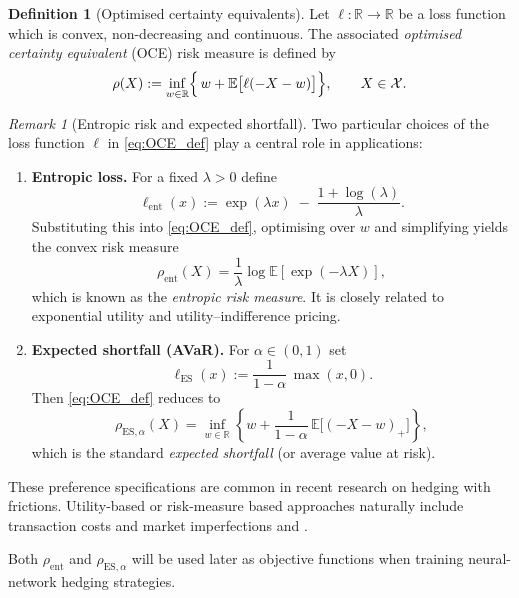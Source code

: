 \documentclass[12pt,a4paper]{article}
\theoremstyle{definition}
\newtheorem{definition}{Definition}[section]
\theoremstyle{plain}
\theoremstyle{remark}
\newtheorem{remark}{Remark}[section]
\theoremstyle{plain}
\begin{document}
\begin{definition}[Optimised certainty equivalents]
\label{def:OCE}
Let $\ell:\mathbb R\to\mathbb R$ be a loss function which is convex, non-decreasing and continuous. 
The associated \emph{optimised certainty equivalent} (OCE) risk measure is defined by
\begin{equation}
\label{eq:OCE_def}
    \rho(X)
    :=
    \inf_{w\in\mathbb R}
    \Bigl\{\,w + \mathbb E\bigl[\ell(-X - w)\bigr]\Bigr\},
    \qquad X\in\mathcal X.
\end{equation}
\end{definition}

\begin{remark}[Entropic risk and expected shortfall]
\label{rem:entropic_es}
Two particular choices of the loss function $\ell$ in \eqref{eq:OCE_def} play a central role in applications:

\begin{enumerate}
    \item \textbf{Entropic loss.}  
    For a fixed $\lambda>0$ define
    \[
        \ell_{\mathrm{ent}}(x)
        :=
        \exp(\lambda x)\;-\;\frac{1+\log(\lambda)}{\lambda}.
    \]
    Substituting this into \eqref{eq:OCE_def}, optimising over $w$ and simplifying yields the convex risk measure
    \[
        \rho_{\mathrm{ent}}(X)
        =
        \frac{1}{\lambda}\log \mathbb E\!\left[\exp(-\lambda X)\right],
    \]
    which is known as the \emph{entropic risk measure}.  
    It is closely related to exponential utility and utility–indifference pricing.

    \item \textbf{Expected shortfall (AVaR).}  
    For $\alpha\in(0,1)$ set
    \[
        \ell_{\mathrm{ES}}(x)
        :=
        \frac{1}{1-\alpha}\,\max(x,0).
    \]
    Then \eqref{eq:OCE_def} reduces to
    \[
        \rho_{\mathrm{ES},\alpha}(X)
        =
        \inf_{w\in\mathbb R}
        \left\{
            w + \frac{1}{1-\alpha}\,
            \mathbb E\bigl[(-X-w)_{+}\bigr]
        \right\},
    \]
    which is the standard \emph{expected shortfall} (or average value at risk).
\end{enumerate}

These preference specifications are common in recent research on hedging with frictions. Utility-based or risk-measure based approaches naturally include transaction costs and market imperfections \cite{DavisPanasZariphopoulou1993} and \cite{WhalleyWilmott2002}.

Both $\rho_{\mathrm{ent}}$ and $\rho_{\mathrm{ES},\alpha}$ will be used later as objective functions when training neural-network hedging strategies.
\end{remark}
\end{document}
